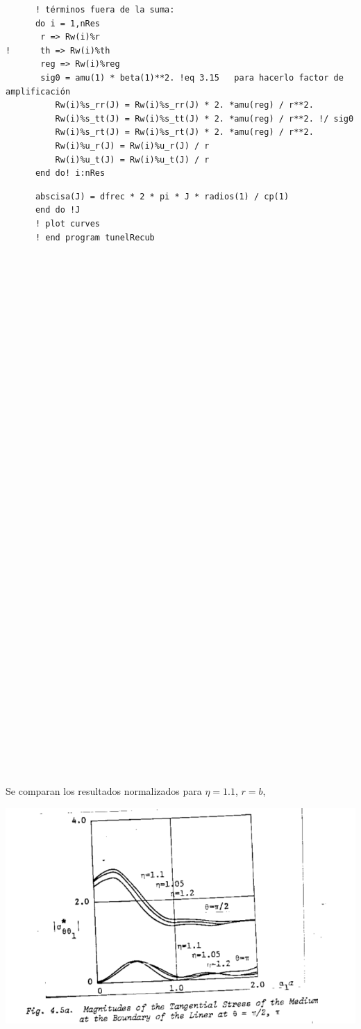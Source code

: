 \documentclass [11pt,spanish]{article}
\begin{document}
\begin{shaded}
\begin{verbatim}
      ! términos fuera de la suma:
      do i = 1,nRes
       r => Rw(i)%r
!      th => Rw(i)%th
       reg => Rw(i)%reg
       sig0 = amu(1) * beta(1)**2. !eq 3.15   para hacerlo factor de amplificación
          Rw(i)%s_rr(J) = Rw(i)%s_rr(J) * 2. *amu(reg) / r**2. 
          Rw(i)%s_tt(J) = Rw(i)%s_tt(J) * 2. *amu(reg) / r**2. !/ sig0
          Rw(i)%s_rt(J) = Rw(i)%s_rt(J) * 2. *amu(reg) / r**2. 
          Rw(i)%u_r(J) = Rw(i)%u_r(J) / r 
          Rw(i)%u_t(J) = Rw(i)%u_t(J) / r 
      end do! i:nRes

\end{verbatim}
\end{shaded}
\endgroup

\begingroup
\fontsize{10pt}{12pt}
\selectfont
{}
\begin{shaded}
\begin{verbatim}
      abscisa(J) = dfrec * 2 * pi * J * radios(1) / cp(1)
      end do !J   
      ! plot curves
      ! end program tunelRecub
      
      
      
      
      
      
      
      
      
      
      
      
      
      
      
      
      
      
      
      
      
      
      
      
      
      
      
      
      
      
      
      
      
      
      
      
      
      
      
\end{verbatim}
\end{shaded}
\endgroup
Se comparan los resultados normalizados para $\eta=1.1$, $r=b$,

\includegraphics[scale=0.4]{res1}
\end{document}
